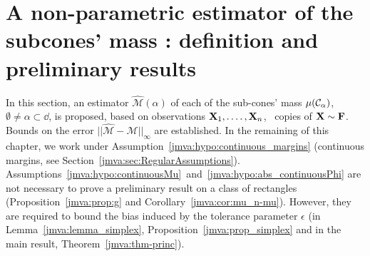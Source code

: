 
\section{A non-parametric estimator of the subcones' mass : definition and preliminary results}
\label{jmva:sec:estimation}

In this section, an estimator $\widehat{\mathcal{M}}(\alpha)$ of each of the sub-cones' mass
$\mu(\mathcal{C}_\alpha)$, $\emptyset\neq\alpha\subset\dd$, is
  proposed, based on observations  $\mathbf X_1,.\ldots, \mathbf X_n$, \iid~copies of $\mathbf X\sim \mathbf F$.
Bounds on the error $\vert\vert
  \widehat{\mathcal{M}}-\mathcal{M}\vert\vert_{\infty}$ are
  established. In the remaining of this chapter, we work under
  Assumption~\ref{jmva:hypo:continuous_margins} (continuous margins, see
  Section~\ref{jmva:sec:RegularAssumptions}). 
Assumptions~\ref{jmva:hypo:continuousMu}~and~\ref{jmva:hypo:abs_continuousPhi}
are not necessary to prove a preliminary result on a class of
rectangles (Proposition~\ref{jmva:prop:g} and Corollary~\ref{jmva:cor:mu_n-mu}). However, they are required %
to bound the bias induced by the tolerance parameter
$\epsilon$ (in Lemma~\ref{jmva:lemma_simplex}, Proposition~\ref{jmva:prop_simplex} and in the main result, Theorem~\ref{jmva:thm-princ}).  
